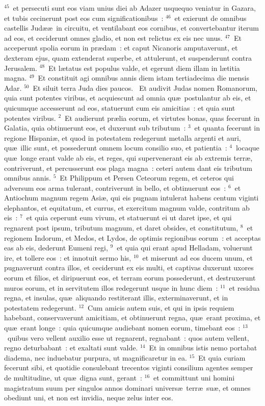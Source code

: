 ${}^{45}$~et persecuti sunt eos viam unius diei ab Adazer usquequo veniatur in Gazara, et tubis cecinerunt post eos cum significationibus~:
${}^{46}$~et exierunt de omnibus castellis Jud\ae \ae\ in circuitu, et ventilabant eos cornibus, et convertebantur iterum ad eos, et ceciderunt omnes gladio, et non est relictus ex eis nec unus.
${}^{47}$~Et acceperunt spolia eorum in pr\ae dam~: et caput Nicanoris amputaverunt, et dexteram ejus, quam extenderat superbe, et attulerunt, et suspenderunt contra Jerusalem.
${}^{48}$~Et l\ae tatus est populus valde, et egerunt diem illam in l\ae titia magna.
${}^{49}$~Et constituit agi omnibus annis diem istam tertiadecima die mensis Adar.
${}^{50}$~Et siluit terra Juda dies paucos.
~Et audivit Judas nomen Romanorum, quia sunt potentes viribus, et acquiescunt ad omnia qu\ae\ postulantur ab eis, et quicumque accesserunt ad eos, statuerunt cum eis amicitias~: et quia sunt potentes viribus.
${}^{2}$~Et audierunt pr\ae lia eorum, et virtutes bonas, quas fecerunt in Galatia, quia obtinuerunt eos, et duxerunt sub tributum~:
${}^{3}$~et quanta fecerunt in regione Hispani\ae , et quod in potestatem redegerunt metalla argenti et auri, qu\ae\ illic sunt, et possederunt omnem locum consilio suo, et patientia~:
${}^{4}$~locaque qu\ae\ longe erant valde ab eis, et reges, qui supervenerant eis ab extremis terr\ae , contriverunt, et percusserunt eos plaga magna~: ceteri autem dant eis tributum omnibus annis.
${}^{5}$~Et Philippum et Persen Ceteorum regem, et ceteros qui adversum eos arma tulerant, contriverunt in bello, et obtinuerunt eos~:
${}^{6}$~et Antiochum magnum regem Asi\ae , qui eis pugnam intulerat habens centum viginti elephantos, et equitatum, et currus, et exercitum magnum valde, contritum ab eis~:
${}^{7}$~et quia ceperunt eum vivum, et statuerunt ei ut daret ipse, et qui regnarent post ipsum, tributum magnum, et daret obsides, et constitutum,
${}^{8}$~et regionem Indorum, et Medos, et Lydos, de optimis regionibus eorum~: et acceptas eas ab eis, dederunt Eumeni regi,
${}^{9}$~et quia qui erant apud Helladam, voluerunt ire, et tollere eos~: et innotuit sermo his,
${}^{10}$~et miserunt ad eos ducem unum, et pugnaverunt contra illos, et ceciderunt ex eis multi, et captivas duxerunt uxores eorum et filios, et diripuerunt eos, et terram eorum possederunt, et destruxerunt muros eorum, et in servitutem illos redegerunt usque in hunc diem~:
${}^{11}$~et residua regna, et insulas, qu\ae\ aliquando restiterant illis, exterminaverunt, et in potestatem redegerunt.
${}^{12}$~Cum amicis autem suis, et qui in ipsis requiem habebant, conservaverunt amicitiam, et obtinuerunt regna, qu\ae\ erant proxima, et qu\ae\ erant longe~: quia quicumque audiebant nomen eorum, timebant eos~:
${}^{13}$~quibus vero vellent auxilio esse ut regnarent, regnabant~: quos autem vellent, regno deturbabant~: et exaltati sunt valde.
${}^{14}$~Et in omnibus istis nemo portabat diadema, nec induebatur purpura, ut magnificaretur in ea.
${}^{15}$~Et quia curiam fecerunt sibi, et quotidie consulebant trecentos viginti consilium agentes semper de multitudine, ut qu\ae\ digna sunt, gerant~:
${}^{16}$~et committunt uni homini magistratum suum per singulos annos dominari univers\ae\ terr\ae\ su\ae , et omnes obediunt uni, et non est invidia, neque zelus inter eos.


